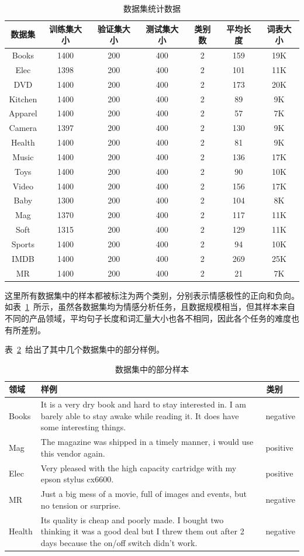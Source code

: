 \begin{table}[htb]
	\centering
	\caption{数据集统计数据}
	\begin{tabular}{ccccccc}
		\toprule[2pt]
		数据集&训练集大小&验证集大小&测试集大小&类别数&平均长度&词表大小\\
		\midrule[1pt]
		Books& 1400& 200& 400& 2& 159& 19K\\
		Elec& 1398& 200& 400& 2& 101& 11K\\
		DVD& 1400& 200& 400& 2& 173& 20K\\
		Kitchen& 1400& 200& 400& 2& 89& 9K\\
		Apparel& 1400& 200& 400& 2& 57& 7K\\
		Camera& 1397& 200& 400& 2& 130& 9K\\
		Health& 1400& 200& 400& 2& 81& 9K\\
		Music& 1400& 200& 400& 2& 136& 17K\\
		Toys& 1400& 200& 400& 2& 90& 10K\\
		Video& 1400& 200& 400& 2& 156& 17K\\
		Baby& 1300& 200& 400& 2& 104& 8K\\
		Mag& 1370& 200& 400& 2& 117& 11K\\
		Soft& 1315& 200& 400& 2& 129& 11K\\
		Sports& 1400& 200& 400& 2& 94& 10K\\
		IMDB& 1400& 200& 400& 2& 269& 25K\\
		MR& 1400& 200& 400& 2& 21& 7K\\
		\bottomrule[2pt]
	\end{tabular}
	\label{tb:dataset}
\end{table}

这里所有数据集中的样本都被标注为两个类别，分别表示情感极性的正向和负向。如表~\ref{tb:dataset}~所示，虽然各数据集均为情感分析任务，且数据规模相当，但其样本来自不同的产品领域，平均句子长度和词汇量大小也各不相同，因此各个任务的难度也有所差别。

表~\ref{tb:examples}~给出了其中几个数据集中的部分样例。
\begin{table}[htb]
\centering
\caption{数据集中的部分样本}
\begin{tabular}{m{1.5cm}m{10cm}m{2cm}}
\toprule[2pt]
领域 & 样例 & \ 类别\\
\midrule[1pt]
Books&It is a very dry book and hard to stay interested in. I am barely able to stay awake while reading it. It does have some interesting things.& \ negative\\
Mag&The magazine was shipped in a timely manner, i would use this vendor again.& \ positive\\
Elec&Very pleased with the high capacity cartridge with my epson stylus cx6600.& \ positive\\
MR&Just a big mess of a movie, full of images and events, but no tension or surprise.& \ negative\\
Health&Its quality is cheap and poorly made. I bought two thinking it was a good deal but I threw them out after 2 days because the on/off switch didn't work.& \ negative\\
\bottomrule[2pt]
\end{tabular}
\label{tb:examples}
\end{table}

